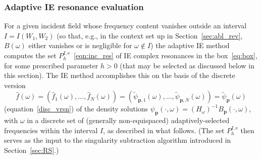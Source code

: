 \documentclass[11pt]{article}
\theoremstyle{plain}
\theoremstyle{remark}
\def \bp{\mathbf{p}}
\begin{document}
\subsubsection{Adaptive IE resonance evaluation\label{adaptive}}
For a given incident field whose frequency content vanishes outside an
interval $I = I(W_1,W_2)$ (so that, e.g., in the context set up in
Section~\ref{sec:abl_rev}, $B(\omega)$ either vanishes or is
negligible for $\omega\not\in I$) the adaptive IE method computes the
set $P_{h}^{I,\mathrm{e}}$~\eqref{eqn:inc_res} of IE complex
resonances in the box~\eqref{eq:box}, for some prescribed parameter
$h > 0$ (that may be selected as discussed below in this section). The
IE method accomplishes this on the basis of the discrete version
\begin{equation}
  \label{eq:F-psi}
  \widehat{f}(\omega) = (\widehat{f}_1(\omega),\dots,\widehat{f}_N(\omega)) =
  (\widetilde\psi_{\bp,1}(\omega),\dots,\widetilde\psi_{\bp,N}(\omega)) = \widetilde\psi_{\bp}(\omega)
\end{equation}
(equation~\eqref{disc_vrsn}) of the density solutions
$\psi_{\mathrm{\bp}}(\cdot,\omega) =
\left(H_{\omega}\right)^{-1}B_\bp(\cdot,\omega)$, with $\omega$ in a
discrete set of (generally non-equispaced) adaptively-selected
frequencies within the interval $I$, as described in what follows. (The
set $P_h^{I,\mathrm{e}}$ then serves as the input to the singularity subtraction
algorithm introduced in Section~\ref{sec:RS}.)
\end{document}

